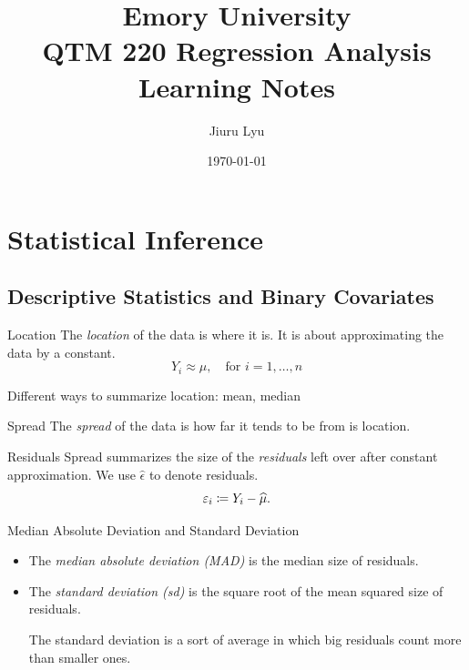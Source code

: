 

\title{Emory University\\\textbf{QTM 220 Regression Analysis}\\ Learning Notes}
\author{Jiuru Lyu}
\date{\today}


\maketitle

\tableofcontents

\newpage
\section{Statistical Inference}
\subsection{Descriptive Statistics and Binary Covariates}
\begin{df}{Location}
	The \textit{location} of the data is where it is. It is about approximating the data by a constant. \[Y_i\approx\mu,\quad\text{for }i=1,\dots,n\]	
\end{df}
\begin{eg}{}
	Different ways to summarize location: mean, median
\end{eg}
\begin{df}{Spread}
	The \textit{spread} of the data is how far it tends to be from is location. 	
\end{df}
\begin{df}{Residuals}
	Spread summarizes the size of the \textit{residuals} left over after constant approximation. We use $\hat\epsilon$ to denote residuals. \[\varepsilon_i\coloneqq Y_i-\widehat\mu.\]
\end{df}
\begin{df}{Median Absolute Deviation and Standard Deviation}
	\begin{itemize}
		\item The \textit{median absolute deviation (MAD)} is the median size of residuals.
		\item The \textit{standard deviation (sd)} is the square root of the mean squared size of residuals. 
		\begin{rmk}The standard deviation is a sort of average in which big residuals count more than smaller ones. \end{rmk}
	\end{itemize}
\end{df}
